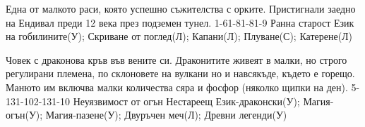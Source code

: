 \begin{multicols}{2}
{Една от малкото раси, която успешно съжителства с орките.
Пристигнали заедно на Ендивал преди 12 века през подземен тунел.}
{1-6}{1-8}{1-8}{1-9}
{
Ранна старост
}
{
Език на гобилините(У);
Скриване от поглед(Л);
Капани(Л);
Плуване(С);
Катерене(Л)
}

{Човек с драконова кръв във вените си.
Драконитите живеят в малки, но строго регулирани племена, по склоновете на вулкани но и навсякъде, където е горещо.
Манюто им включва малки количества сяра и фосфор (няколко щипки на ден).}
{5-13}{1-10}{2-13}{1-10}
{
Неуязвимост от огън
Нестареещ
}
{
Език-драконски(У);
Магия-огън(У);
Магия-пазене(У);
Двуръчен меч(Л);
Древни легенди(У)
}

\end{multicols}
